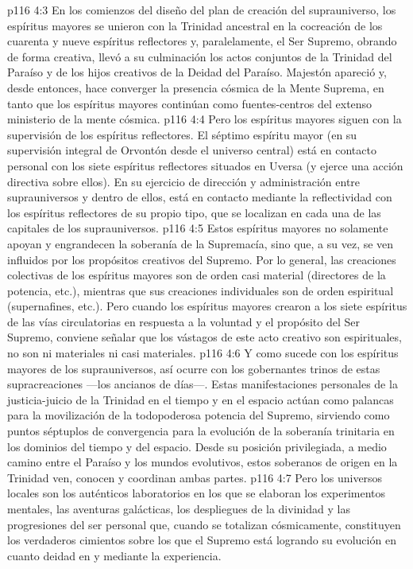 \vs p116 4:3 En los comienzos del diseño del plan de creación del suprauniverso, los espíritus mayores se unieron con la Trinidad ancestral en la cocreación de los cuarenta y nueve espíritus reflectores y, paralelamente, el Ser Supremo, obrando de forma creativa, llevó a su culminación los actos conjuntos de la Trinidad del Paraíso y de los hijos creativos de la Deidad del Paraíso. Majestón apareció y, desde entonces, hace converger la presencia cósmica de la Mente Suprema, en tanto que los espíritus mayores continúan como fuentes\hyp{}centros del extenso ministerio de la mente cósmica.
\vs p116 4:4 Pero los espíritus mayores siguen con la supervisión de los espíritus reflectores. El séptimo espíritu mayor (en su supervisión integral de Orvontón desde el universo central) está en contacto personal con los siete espíritus reflectores situados en Uversa (y ejerce una acción directiva sobre ellos). En su ejercicio de dirección y administración entre suprauniversos y dentro de ellos, está en contacto mediante la reflectividad con los espíritus reflectores de su propio tipo, que se localizan en cada una de las capitales de los suprauniversos.
\vs p116 4:5 Estos espíritus mayores no solamente apoyan y engrandecen la soberanía de la Supremacía, sino que, a su vez, se ven influidos por los propósitos creativos del Supremo. Por lo general, las creaciones colectivas de los espíritus mayores son de orden casi material (directores de la potencia, etc.), mientras que sus creaciones individuales son de orden espiritual (supernafines, etc.). Pero cuando los espíritus mayores crearon  a los siete espíritus de las vías circulatorias en respuesta a la voluntad y el propósito del Ser Supremo, conviene señalar que los vástagos de este acto creativo son espirituales, no son ni materiales ni casi materiales.
\vs p116 4:6 \pc Y como sucede con los espíritus mayores de los suprauniversos, así ocurre con los gobernantes trinos de estas supracreaciones ---los ancianos de días---. Estas manifestaciones personales de la justicia\hyp{}juicio de la Trinidad en el tiempo y en el espacio actúan como palancas para la movilización de la todopoderosa potencia del Supremo, sirviendo como puntos séptuplos de convergencia para la evolución de la soberanía trinitaria en los dominios del tiempo y del espacio. Desde su posición privilegiada, a medio camino entre el Paraíso y los mundos evolutivos, estos soberanos de origen en la Trinidad ven, conocen y coordinan ambas partes.
\vs p116 4:7 \pc Pero los universos locales son los auténticos laboratorios en los que se elaboran los experimentos mentales, las aventuras galácticas, los despliegues de la divinidad y las progresiones del ser personal que, cuando se totalizan cósmicamente, constituyen los verdaderos cimientos sobre los que el Supremo está logrando su evolución en cuanto deidad en y mediante la experiencia.
